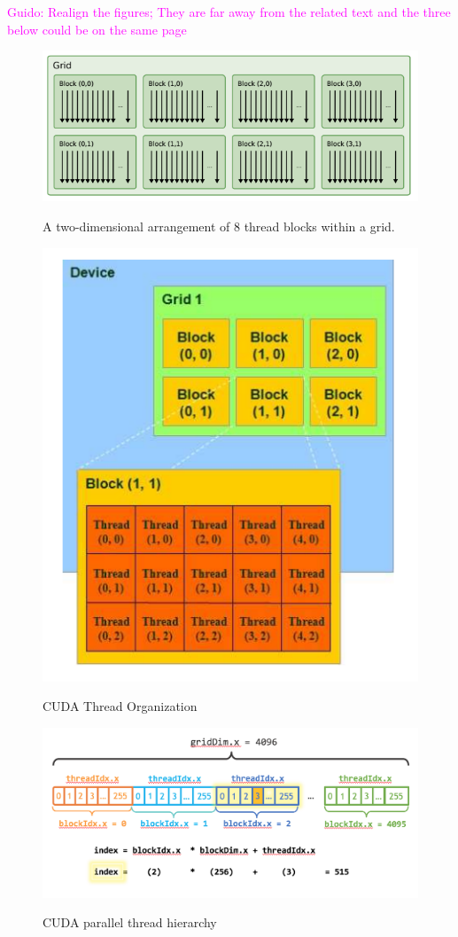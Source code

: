 \documentclass[Ingles]{ic-tese-v1}
\newcommand{\guido}[1]{\noindent\textcolor{magenta}{Guido: {#1}}}
\newcommand{\guido}[1]{}
\begin{document}
\guido{Realign the figures; They are far away from the related text and the three below could be on the same page}
\begin{figure}[t]
	\centering
	\caption{A two-dimensional arrangement of 8 thread blocks within a grid.}
	\includegraphics[scale=0.75]{images/threadsblock.png}
	\label{fig:threadsblocks}
\end{figure}

\begin{figure}[h]
	\centering
	\caption{CUDA Thread Organization}
	\includegraphics[scale=0.45]{images/thread_organization.png}
	\label{fig:threadorganization}
\end{figure}
\begin{figure}[h!]
	\caption{CUDA parallel thread hierarchy}
	\centering
	\includegraphics[scale=0.50]{images/cuda_indexing.png}
	\label{fig:cudaindex}
\end{figure}
\end{document}
